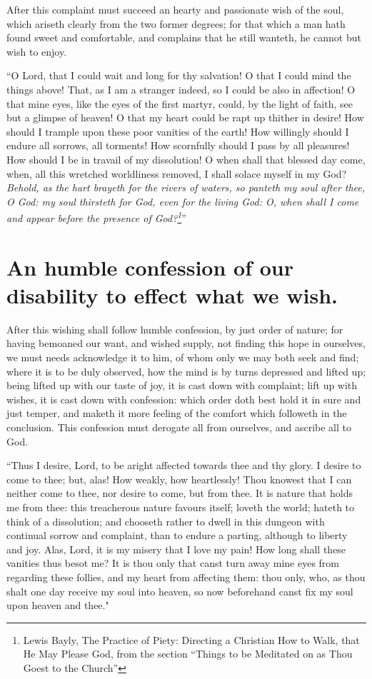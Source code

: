 After this complaint must succeed an hearty and passionate wish of the soul, which ariseth clearly from the two former degrees; for that which a man hath found sweet and comfortable, and complains that he still wanteth, he cannot but wish to enjoy. 

``O Lord, that I could wait and long for thy salvation! O that I could mind the things above! That, as I am a stranger indeed, so I could be also in affection! O that mine eyes, like the eyes of the first martyr, could, by the light of faith, see but a glimpse of heaven! O that my heart could be rapt up thither in desire! How should I trample upon these poor vanities of the earth! How willingly should I endure all sorrows, all torments! How scornfully should I pass by all pleasures! How should I be in travail of my dissolution! O when shall that blessed day come, when, all this wretched worldliness removed, I shall solace myself in my God? \emph{Behold, as the hart brayeth for the rivers of waters, so panteth my soul after thee, O God: my soul thirsteth for God, even for the living God: O, when shall I come and appear before the presence of God?\footnote{Lewis Bayly, The Practice of Piety: Directing a Christian How to Walk, that He May Please God, from the section ``Things to be Meditated on as Thou Goest to the Church''  }}'' 

\section{An humble confession of our disability to effect what we wish.}

After this wishing shall follow humble confession, by just order of nature; for having bemoaned our want, and wished supply, not finding this hope in ourselves, we must needs acknowledge it to him, of whom only we may both seek and find; where it is to be duly observed, how the mind is by turns depressed and lifted up; being lifted up with our taste of joy, it is cast down with complaint; lift up with wishes, it is cast down with confession: which order doth best hold it in sure and just temper, and maketh it more feeling of the comfort which followeth in the conclusion. This confession must derogate all from ourselves, and ascribe all to God. 

``Thus I desire, Lord, to be aright affected towards thee and thy glory. I desire to come to thee; but, alas! How weakly, how heartlessly! Thou knowest that I can neither come to thee, nor desire to come, but from thee. It is nature that holds me from thee: this treacherous nature favours itself; loveth the world; hateth to think of a dissolution; and chooseth rather to dwell in this dungeon with continual sorrow and complaint, than to endure a parting, although to liberty and joy. Alas, Lord, it is my misery that I love my pain! How long shall these vanities thus besot me? It is thou only that canst turn away mine eyes from regarding these follies, and my heart from affecting them: thou only, who, as thou shalt one day receive my soul into heaven, so now beforehand canst fix my soul upon heaven and thee." 

